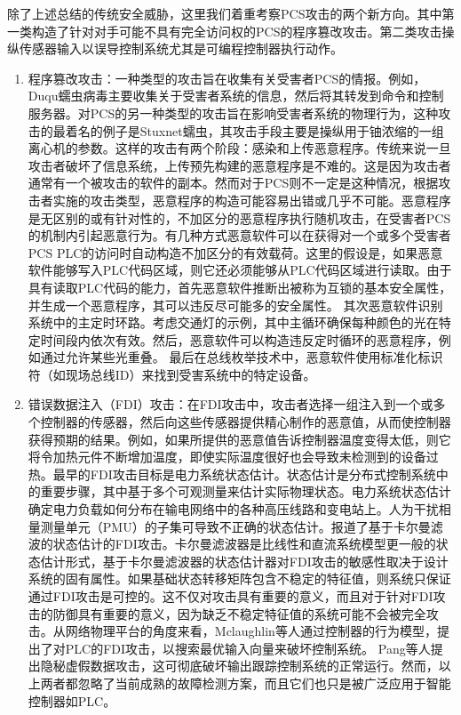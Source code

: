 除了上述总结的传统安全威胁，这里我们着重考察PCS攻击的两个新方向。其中第一类构造了针对对手可能不具有完全访问权的PCS的程序篡改攻击。第二类攻击操纵传感器输入以误导控制系统尤其是可编程控制器执行动作。
\begin{enumerate}
\item 程序篡改攻击：一种类型的攻击旨在收集有关受害者PCS的情报。例如，Duqu蠕虫病毒主要收集关于受害者系统的信息\parencite{Duqu11}，然后将其转发到命令和控制服务器。对PCS的另一种类型的攻击旨在影响受害者系统的物理行为，这种攻击的最着名的例子是Stuxnet蠕虫，其攻击手段主要是操纵用于铀浓缩的一组离心机的参数。这样的攻击有两个阶段：感染和上传恶意程序。传统来说一旦攻击者破坏了信息系统，上传预先构建的恶意程序是不难的。这是因为攻击者通常有一个被攻击的软件的副本。然而对于PCS则不一定是这种情况，根据攻击者实施的攻击类型，恶意程序的构造可能容易出错或几乎不可能。恶意程序是无区别的或有针对性的，不加区分的恶意程序执行随机攻击，在受害者PCS的机制内引起恶意行为。有几种方式恶意软件可以在获得对一个或多个受害者PCS PLC的访问时自动构造不加区分的有效载荷\parencite{McLaughlin112}。这里的假设是，如果恶意软件能够写入PLC代码区域，则它还必须能够从PLC代码区域进行读取。由于具有读取PLC代码的能力，首先恶意软件推断出被称为互锁的基本安全属性\parencite{Chevillat08}，并生成一个恶意程序，其可以违反尽可能多的安全属性。 其次恶意软件识别系统中的主定时环路。考虑交通灯的示例，其中主循环确保每种颜色的光在特定时间段内依次有效。然后，恶意软件可以构造违反定时循环的恶意程序，例如通过允许某些光重叠。 最后在总线枚举技术中，恶意软件使用标准化标识符（如现场总线ID）来找到受害系统中的特定设备\parencite{PROFIBUS10}。
\item 错误数据注入（FDI）攻击：在FDI攻击中，攻击者选择一组注入到一个或多个控制器的传感器，然后向这些传感器提供精心制作的恶意值，从而使控制器获得预期的结果。例如，如果所提供的恶意值告诉控制器温度变得太低，则它将令加热元件不断增加温度，即使实际温度很好也会导致未检测到的设备过热。最早的FDI攻击目标是电力系统状态估计\parencite{Liu10}。状态估计是分布式控制系统中的重要步骤，其中基于多个可观测量来估计实际物理状态。电力系统状态估计确定电力负载如何分布在输电网络中的各种高压线路和变电站上。人为干扰相量测量单元（PMU）的子集可导致不正确的状态估计\parencite{Liu10}。报道了基于卡尔曼滤波的状态估计的FDI攻击。卡尔曼滤波器是比线性和直流系统模型更一般的状态估计形式，基于卡尔曼滤波器的状态估计器对FDI攻击的敏感性取决于设计系统的固有属性\parencite{Liu10}。如果基础状态转移矩阵包含不稳定的特征值，则系统只保证通过FDI攻击是可控的。这不仅对攻击具有重要的意义，而且对于针对FDI攻击的防御具有重要的意义，因为缺乏不稳定特征值的系统可能不会被完全攻击。从网络物理平台的角度来看，Mclaughlin等人\parencite {mclaughlinS2014}通过控制器的行为模型，提出了对PLC的FDI攻击，以搜索最优输入向量来破坏控制系统。 Pang等人\parencite {pang2015}提出隐秘虚假数据攻击，这可彻底破坏输出跟踪控制系统的正常运行。然而，以上两者都忽略了当前成熟的故障检测方案\parencite{roth2012,garcia2012,klein2005}，而且它们也只是被广泛应用于智能控制器如PLC。

\end{enumerate}


